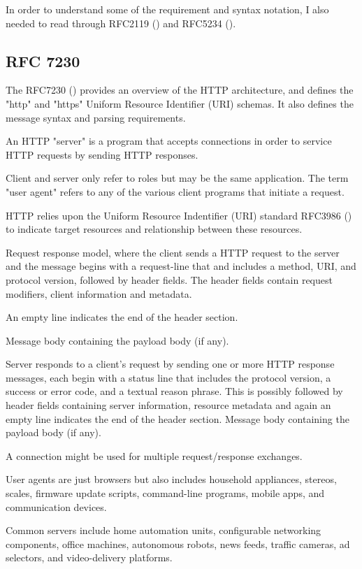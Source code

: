 \documentclass[12pt, a4paper]{article}
\begin{document}
In order to understand some of the requirement and syntax notation, I also needed to read through
RFC2119 (\cite{rfc2119}) and RFC5234 (\cite{rfc5234}).

\subsection{RFC 7230}
\label{sec:rfc7230}

The RFC7230 (\cite{rfc7230}) provides an overview of the HTTP architecture, and defines the "http"
and "https" Uniform Resource Identifier (URI) schemas. It also defines the message syntax and parsing
requirements.

An HTTP "server" is a program that accepts connections in order to service HTTP requests by sending
HTTP responses.

Client and server only refer to roles but may be the same application. The term "user agent" refers
to any of the various client programs that initiate a request.

HTTP relies upon the Uniform Resource Indentifier (URI) standard RFC3986 (\cite{rfc3986}) to indicate
target resources and relationship between these resources.

Request response model, where the client sends a HTTP request to the server and the message begins
with a request-line that and includes a method, URI, and protocol version, followed by header fields.
The header fields contain request modifiers, client information and metadata.

An empty line indicates the end of the header section.

Message body containing the payload body (if any).

Server responds to a client's request by sending one or more HTTP response messages, each begin with
a status line that includes the protocol version, a success or error code, and a textual reason
phrase. This is possibly followed by header fields containing server information, resource metadata
and again an empty line indicates the end of the header section. Message body containing the payload
body (if any).

A connection might be used for multiple request/response exchanges.

User agents are just browsers but also includes household appliances, stereos, scales, firmware
update scripts, command-line programs, mobile apps, and communication devices.

Common servers include home automation units, configurable networking components, office machines,
autonomous robots, news feeds, traffic cameras, ad selectors, and video-delivery platforms.
\end{document}
